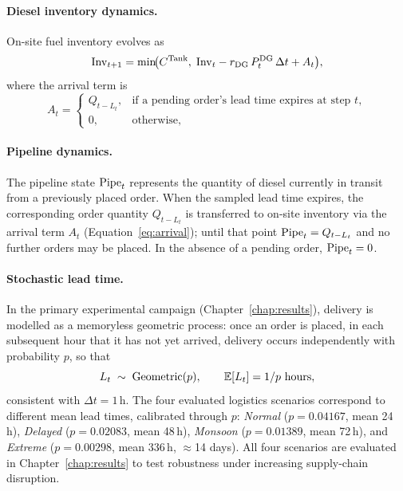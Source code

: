 \paragraph{Diesel inventory dynamics.}
On-site fuel inventory evolves as
\begin{equation}
\mathrm{Inv}_{t+1} = \min\!\bigl(C^{\mathrm{Tank}},\;
  \mathrm{Inv}_t - r_{\mathrm{DG}}\,P_t^{\mathrm{DG}}\,\Delta t + A_t\bigr),
\label{eq:inv}
\end{equation}
where the arrival term is
\begin{equation}
A_t =
\begin{cases}
  Q_{t-L_t}, & \text{if a pending order's lead time expires at step } t, \\
  0,          & \text{otherwise,}
\end{cases}
\label{eq:arrival}
\end{equation}

\paragraph{Pipeline dynamics.}
The pipeline state $\mathrm{Pipe}_t$ represents the quantity of diesel currently in
transit from a previously placed order. When the sampled lead time expires,
the corresponding order quantity $Q_{t-L_t}$ is transferred to on-site
inventory via the arrival term $A_t$ (Equation~\eqref{eq:arrival}); until
that point $\mathrm{Pipe}_t = Q_{t-L_t}$ and no further orders may be placed. In
the absence of a pending order, $\mathrm{Pipe}_t = 0$.

\paragraph{Stochastic lead time.}
In the primary experimental campaign (Chapter~\ref{chap:results}), delivery
is modelled as a memoryless geometric process: once an order is placed,
in each subsequent hour that it has not yet arrived, delivery occurs
independently with probability $p$, so that
\begin{equation}
L_t \;\sim\; \mathrm{Geometric}(p), \qquad \mathbb{E}[L_t] = 1/p \text{ hours},
\label{eq:leadtime}
\end{equation}
consistent with $\Delta t = 1$\,h. The four evaluated logistics scenarios
correspond to different mean lead times, calibrated through $p$: \emph{Normal}
($p=0.04167$, mean 24\,h), \emph{Delayed} ($p=0.02083$, mean 48\,h),
\emph{Monsoon} ($p=0.01389$, mean 72\,h), and \emph{Extreme} ($p=0.00298$,
mean 336\,h, $\approx$14 days). All four scenarios are evaluated in
Chapter~\ref{chap:results} to test robustness under increasing
supply-chain disruption.

